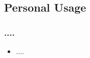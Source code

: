 \subsection{Personal Usage}

\begin{frame}
\frametitle{....}

  \begin{itemize}
    \item ....    
  \end{itemize}
  
\end{frame}




